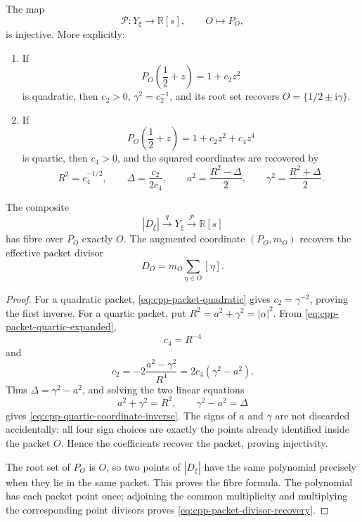 \begin{theorem}
\label{thm:cpp-packet-polynomial-inverse}
The map
\begin{equation}
\label{eq:cpp-packet-polynomial-map}
 \mathcal P:Y_\xi\longrightarrow\mathbb R[s],
 \qquad O\longmapsto P_O,
\end{equation}
is injective.  More explicitly:
\begin{enumerate}
\item If
\[
 P_O\!\left(\frac12+z\right)=1+c_2z^2
\]
is quadratic, then \(c_2>0\), \(\gamma^2=c_2^{-1}\), and its root set
recovers \(O=\{1/2\pm\mathrm i\gamma\}\).
\item If
\[
 P_O\!\left(\frac12+z\right)=1+c_2z^2+c_4z^4
\]
is quartic, then \(c_4>0\), and the squared coordinates are recovered by
\begin{equation}
\label{eq:cpp-quartic-coordinate-inverse}
 R^2=c_4^{-1/2},
 \qquad
 \Delta=\frac{c_2}{2c_4},
 \qquad
 a^2=\frac{R^2-\Delta}{2},
 \qquad
 \gamma^2=\frac{R^2+\Delta}{2}.
\end{equation}
\end{enumerate}
The composite
\[
 |D_\xi|\xrightarrow{q}Y_\xi
 \xrightarrow{\mathcal P}\mathbb R[s]
\]
has fibre over \(P_O\) exactly \(O\).  The augmented coordinate
\((P_O,m_O)\) recovers the effective packet divisor
\begin{equation}
\label{eq:cpp-packet-divisor-recovery}
 D_O=m_O\sum_{\eta\in O}[\eta].
\end{equation}
\end{theorem}

\begin{proof}
For a quadratic packet, \eqref{eq:cpp-packet-quadratic} gives
\(c_2=\gamma^{-2}\), proving the first inverse.  For a quartic packet, put
\(R^2=a^2+\gamma^2=|\alpha|^2\).  From
\eqref{eq:cpp-packet-quartic-expanded},
\[
 c_4=R^{-4}
\]
and
\[
 c_2
 =
 -2\frac{a^2-\gamma^2}{R^4}
 =
 2c_4(\gamma^2-a^2).
\]
Thus \(\Delta=\gamma^2-a^2\), and solving the two linear equations
\[
 a^2+\gamma^2=R^2,
 \qquad
 \gamma^2-a^2=\Delta
\]
gives \eqref{eq:cpp-quartic-coordinate-inverse}.  The signs of \(a\) and
\(\gamma\) are not discarded accidentally: all four sign choices are exactly
the points already identified inside the packet \(O\).  Hence the coefficients
recover the packet, proving injectivity.

The root set of \(P_O\) is \(O\), so two points of \(|D_\xi|\) have the same
polynomial precisely when they lie in the same packet.  This proves the fibre
formula.  The polynomial has each packet point once; adjoining the common
multiplicity and multiplying the corresponding point divisors proves
\eqref{eq:cpp-packet-divisor-recovery}.
\end{proof}

